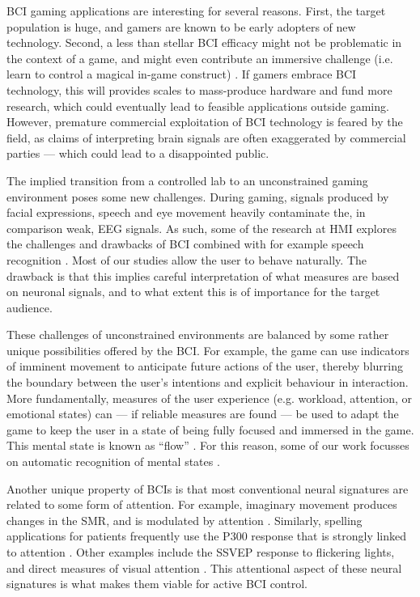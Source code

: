 \Ac{BCI} gaming applications are interesting for several reasons.
First, the target population is huge, and gamers are known to be early adopters
of new technology. Second, a less than stellar \ac{BCI} efficacy might not be
problematic in the context of a game, and might even contribute an immersive
challenge (i.e. learn to control a magical in-game construct)
\cite{nijholt2009tsc2}. 
%
If gamers embrace \ac{BCI} technology, this will provides scales to mass-produce
hardware and fund more research, which could eventually lead to feasible
applications outside gaming. However, premature commercial exploitation of
\ac{BCI} technology is feared by the field, as claims of interpreting brain signals are often exaggerated by commercial parties --- which could lead to a disappointed public.

The implied transition from a controlled lab to an unconstrained gaming
environment poses some new challenges. During gaming, signals produced by
facial expressions, speech and eye movement heavily contaminate the, in
comparison weak, \acs{EEG} signals. As such, some of the research at \ac{HMI}
explores the challenges and drawbacks of \ac{BCI} combined with for example
speech recognition \cite{gurkok2010cmi}. Most of our studies allow the user to
behave naturally. The drawback is that this implies careful interpretation of
what measures are based on neuronal signals, and to what extent this is of
importance for the target audience. 

These challenges of unconstrained environments are balanced by some rather
unique possibilities offered by the \ac{BCI}. For example, the game can use
indicators of imminent movement to anticipate future actions of the user,
thereby blurring the boundary between the user's intentions and explicit
behaviour in interaction. More fundamentally, measures of the user experience
(e.g. workload, attention, or emotional states) can --- if reliable measures
are found --- be used to adapt the game to keep the user in a
state of being fully focused and immersed in the game. This mental state is
known as ``flow'' \cite{csikszentmihalyi1990fpo}. For this reason, some of our
work focusses on automatic recognition of mental states
\cite{reuderink2012vad}. 
 
Another unique property of \acp{BCI} is that most conventional neural
signatures are related to some form of attention. For example, imaginary
movement produces changes in the \ac{SMR}, and is modulated by attention
\cite{kirsteva-feige2002eap}. Similarly, spelling applications for patients
frequently use the P300 response that is strongly linked to attention
\cite{gray2004pia}. Other examples include the \ac{SSVEP} response to
flickering lights, and direct measures of visual attention
\cite{vangerven2009amp}. This attentional aspect of these neural signatures is
what makes them viable for active \ac{BCI} control.
 
